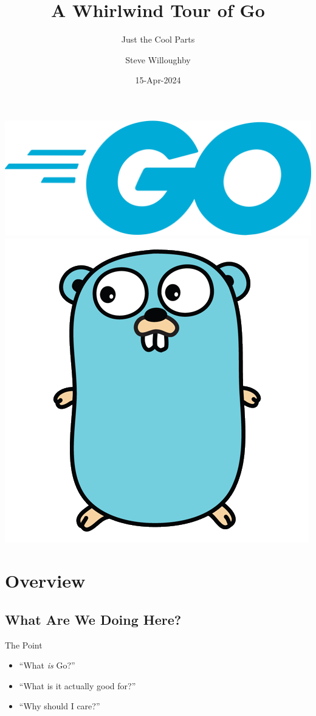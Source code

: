 \documentclass[pdf,t]{beamer}
\title{A Whirlwind Tour of Go}
\subtitle{Just the Cool Parts}
\author{Steve Willoughby}
\date{15-Apr-2024\\{\tiny\REV}}
\begin{document}
\begin{frame}
    \titlepage
    \begin{center}
    \includegraphics[height=.25\textheight]{go-logo}
    \includegraphics[height=.25\textheight]{gopher}
    \end{center}
\end{frame}
\section[Overview]{Overview}
\subsection{What Are We Doing Here?}
\begin{frame}{The Point}
    \begin{itemize}
        \item ``What \emph{is} Go?''
        \item ``What is it actually good for?''
        \item ``Why should I care?''
    \end{itemize}
\end{frame}
\end{document}

